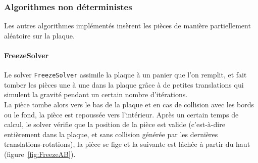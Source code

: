 \subsubsection{Algorithmes non déterministes}

Les autres algorithmes implémentés insèrent les pièces de manière partiellement aléatoire sur la plaque.\\

\paragraph{FreezeSolver}
Le solver \texttt{FreezeSolver} assimile la plaque à un panier que l'on remplit, et fait tomber les pièces une à une dans la plaque grâce à de petites translations qui simulent la gravité pendant un certain nombre d'itérations.\\
\indent La pièce tombe alors vers le bas de la plaque et en cas de collision avec les bords ou le fond, la pièce est repoussée vers l'intérieur. Après un certain temps de calcul, le solver vérifie que la position de la pièce est valide (c'est-à-dire entièrement dans la plaque, et sans collision générée par les dernières translations-rotations), la pièce se fige et la suivante est lâchée à partir du haut (figure~\ref{fig:FreezeAB}).\\


